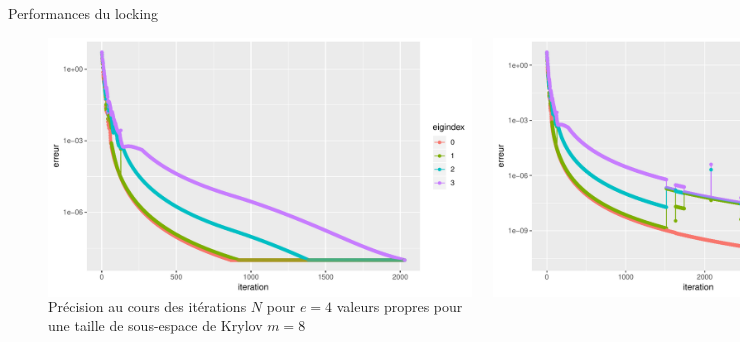 \documentclass[9.5pt]{beamer}
\begin{document}
		\begin{frame}{Performances du locking}
			\begin{figure}
				\centering
				\begin{columns}
					\centering
					\includegraphics[width=\linewidth, keepaspectratio]{../rapport/plots/wlock_e4_p8_m8.pdf}
					\caption{Avec locking\label{wlock_e4_p8_m8}}

					\centering
					\includegraphics[width=\linewidth, keepaspectratio]{../rapport/plots/wolock_e4_p8_m8.pdf}
					\caption{Sans locking\label{wolock_e4_p8_m8}}
				\end{columns}
				\caption{Précision au cours des itérations $N$ pour $e = 4$ valeurs propres pour une taille de sous-espace de Krylov $m=8$\label{fig:comp_locks}}
			\end{figure}
		\end{frame}
\end{document}
